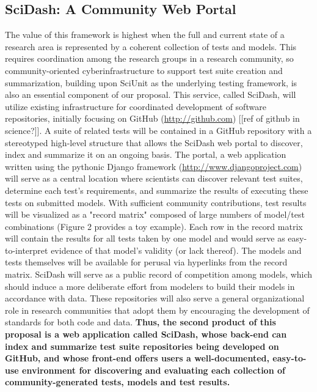 \documentclass[11pt,letterpaper]{article}
\begin{document}
\subsection{SciDash: A Community Web Portal}
The value of this framework is highest when the full and current state of a research area is represented by a coherent collection of tests and models. This requires coordination among the research groups in a research community, so community-oriented cyberinfrastructure to support test suite creation and summarization, building upon SciUnit as the underlying testing framework, is also an essential component of our proposal. This service, called SciDash, will utilize existing infrastructure for coordinated development of software repositories, initially focusing on GitHub (\url{http://github.com}) [[ref of github in science?]]. A suite of related tests will be contained in a GitHub repository with a stereotyped high-level structure that allows the SciDash web portal to discover, index and summarize it on an ongoing basis. The portal, a web application written using the pythonic Django framework (\url{http://www.djangoproject.com}) will serve as a central location where scientists can discover relevant test suites, determine each test's requirements, and summarize the results of executing these tests on submitted models. With sufficient community contributions, test results will be visualized as a "record matrix" composed of large numbers of model/test combinations (Figure 2 provides a toy example).  Each row in the record matrix will contain the results for all tests taken by one model and would serve as easy-to-interpret evidence of that model's validity (or lack thereof).  The models and tests themselves will be available for perusal via hyperlinks from the record matrix. SciDash will serve as a public record of competition among models, which should induce a more deliberate effort from modelers to build their models in accordance with data. These repositories will also serve a general organizational role in research communities that adopt them by encouraging the development of standards for both code and data. \textbf{Thus, the second product of this proposal is a web application called \textbf{SciDash}, whose back-end can index and summarize test suite repositories being developed on GitHub, and whose front-end offers users a well-documented, easy-to-use environment for discovering and evaluating each collection of community-generated tests, models and test results.}
\end{document}

